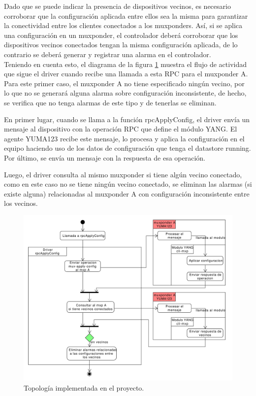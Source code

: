  Dado que se puede indicar la presencia de dispositivos vecinos, es necesario corroborar que la configuración aplicada entre ellos sea la misma para garantizar la conectividad entre los clientes conectados a los muxponders. Así, si se aplica una configuración en un muxponder, el controlador deberá corroborar que los dispositivos vecinos conectados tengan la misma configuración aplicada, de lo contrario se deberá generar y registrar una alarma en el controlador.
  \\

  Teniendo en cuenta esto, el diagrama de la figura \ref{fig:actividad_driver_rpc_sin_vecinos} muestra el flujo de actividad que sigue el driver cuando recibe una llamada a esta RPC para el muxponder A. Para este primer caso, el muxponder A no tiene especificado ningún vecino, por lo que no se generará alguna alarma sobre configuración inconsistente, de hecho, se verifica que no tenga alarmas de este tipo y de tenerlas se eliminan.

  En primer lugar, cuando se llama a la función rpcApplyConfig, el driver envía un mensaje al dispositivo con la operación RPC que define el módulo YANG. El agente YUMA123 recibe este mensaje, lo procesa y aplica la configuración en el equipo haciendo uso de los datos de configuración que tenga el datastore running. Por último, se envía un mensaje con la respuesta de esa operación. 

  Luego, el driver consulta al mismo muxponder si tiene algún vecino conectado, como en este caso no se tiene ningún vecino conectado, se eliminan las alarmas (si existe alguna) relacionadas al muxponder A con configuración inconsistente entre los vecinos.

  \begin{figure}[H]
    \centering
    \includegraphics[scale=0.45]{Figures/actividad_driver_rpc_sin_vecinos.pdf}
    \caption{Topología implementada en el proyecto.}
    \label{fig:actividad_driver_rpc_sin_vecinos}
  \end{figure}

